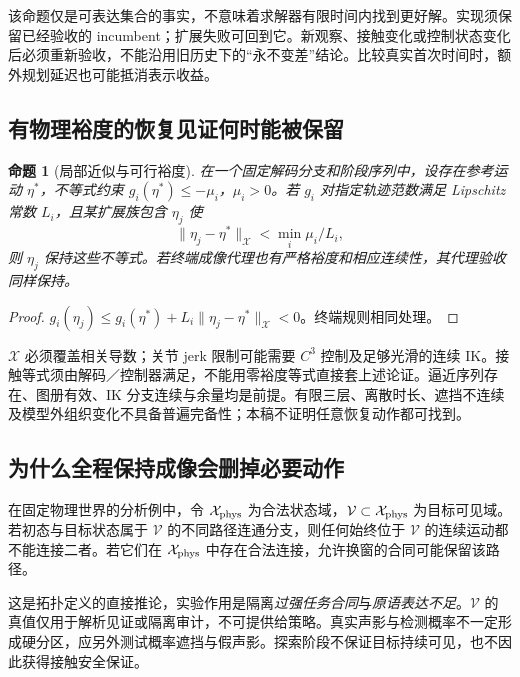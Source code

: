 \documentclass[UTF8,fontset=fandol,11pt,a4paper]{ctexart}
\theoremstyle{plain}
\newtheorem{proposition}[theorem]{命题}
\theoremstyle{definition}
\theoremstyle{remark}
\numberwithin{equation}{section}
\begin{document}
该命题仅是可表达集合的事实，不意味着求解器有限时间内找到更好解。实现须保留已经验收的 incumbent；扩展失败可回到它。新观察、接触变化或控制状态变化后必须重新验收，不能沿用旧历史下的“永不变差”结论。比较真实首次时间时，额外规划延迟也可能抵消表示收益。

\subsection{有物理裕度的恢复见证何时能被保留}
\begin{proposition}[局部近似与可行裕度]
在一个固定解码分支和阶段序列中，设存在参考运动 $\eta^*$，不等式约束 $g_i(\eta^*)\le-\mu_i$，$\mu_i>0$。若 $g_i$ 对指定轨迹范数满足 Lipschitz 常数 $L_i$，且某扩展族包含 $\eta_j$ 使
\begin{equation}
\|\eta_j-\eta^*\|_{\mathcal X}<\min_i\mu_i/L_i,
\end{equation}
则 $\eta_j$ 保持这些不等式。若终端成像代理也有严格裕度和相应连续性，其代理验收同样保持。
\end{proposition}
\begin{proof}
$g_i(\eta_j)\le g_i(\eta^*)+L_i\|\eta_j-\eta^*\|_{\mathcal X}<0$。终端规则相同处理。
\end{proof}

$\mathcal X$ 必须覆盖相关导数；关节 jerk 限制可能需要 $C^3$ 控制及足够光滑的连续 IK。接触等式须由解码／控制器满足，不能用零裕度等式直接套上述论证。逼近序列存在、图册有效、IK 分支连续与余量均是前提。有限三层、离散时长、遮挡不连续及模型外组织变化不具备普遍完备性；本稿不证明任意恢复动作都可找到。

\subsection{为什么全程保持成像会删掉必要动作}
在固定物理世界的分析例中，令 $\mathcal X_{\rm phys}$ 为合法状态域，$\mathcal V\subset\mathcal X_{\rm phys}$ 为目标可见域。若初态与目标状态属于 $\mathcal V$ 的不同路径连通分支，则任何始终位于 $\mathcal V$ 的连续运动都不能连接二者。若它们在 $\mathcal X_{\rm phys}$ 中存在合法连接，允许换窗的合同可能保留该路径。

这是拓扑定义的直接推论，实验作用是隔离\emph{过强任务合同}与\emph{原语表达不足}。$\mathcal V$ 的真值仅用于解析见证或隔离审计，不可提供给策略。真实声影与检测概率不一定形成硬分区，应另外测试概率遮挡与假声影。探索阶段不保证目标持续可见，也不因此获得接触安全保证。
\end{document}
